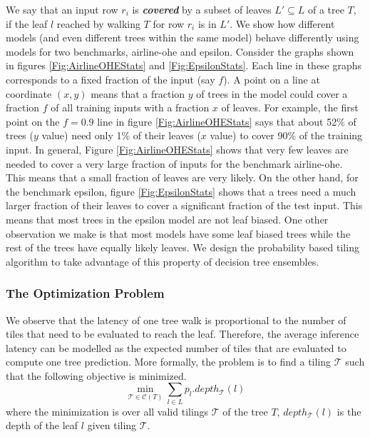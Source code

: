 We say that an input row $r_i$ is \textbf{\emph{covered}} by a subset of leaves $L' \subseteq L$ of a tree $T$, if the leaf $l$ reached by 
walking $T$ for row $r_i$ is in $L'$. We show how different models (and even different trees within the same model) behave differently 
using models for two benchmarks, airline-ohe and epsilon. Consider the graphs shown in   
figures \ref{Fig:AirlineOHEStats} and \ref{Fig:EpsilonStats}. Each line in these graphs corresponds to a fixed fraction of the input (say $f$). 
A point on a line at coordinate $(x, y)$ means that a fraction $y$ of trees in the model could cover a fraction $f$ of all training inputs with a fraction $x$ of 
leaves. For example, the first point on the $f=0.9$ line in figure \ref{Fig:AirlineOHEStats} says that about 52\% of trees ($y$ value) need only 1\% of their
leaves ($x$ value) to cover 90\% of the training input. 
In general, Figure \ref{Fig:AirlineOHEStats} shows that very few leaves are needed to cover a very large fraction of inputs for the benchmark airline-ohe. 
This means that a small fraction of leaves are very likely. On the other hand, for the benchmark epsilon,
figure \ref{Fig:EpsilonStats} shows that a trees need a much larger fraction of their leaves to cover a significant fraction of the test input.
This means that most trees in the epsilon model are not leaf biased.
One other observation we make is that most models have some leaf biased trees while the rest of the trees have equally likely leaves.
 We design the probability based tiling algorithm to take advantage of this property 
of decision tree ensembles. 

\subsubsection{The Optimization Problem}


We observe that the latency of one tree walk is proportional to the number of tiles that need to be evaluated to reach the leaf.
Therefore, the average inference latency can be modelled as the expected number of tiles that are evaluated to compute one tree prediction. More formally, the problem is to find a tiling $\mathcal{T}$ such that the following objective is minimized.
\[
    \min_{\mathcal{T} \in \mathcal{C}(T)}{\sum_{l \in L} p_l.depth_{\mathcal{T}}(l)}
\]
where the minimization is over all valid tilings $\mathcal{T}$ of the tree $T$, $depth_{\mathcal{T}}(l)$ is the depth of the leaf $l$ given tiling ${\mathcal{T}}$.

